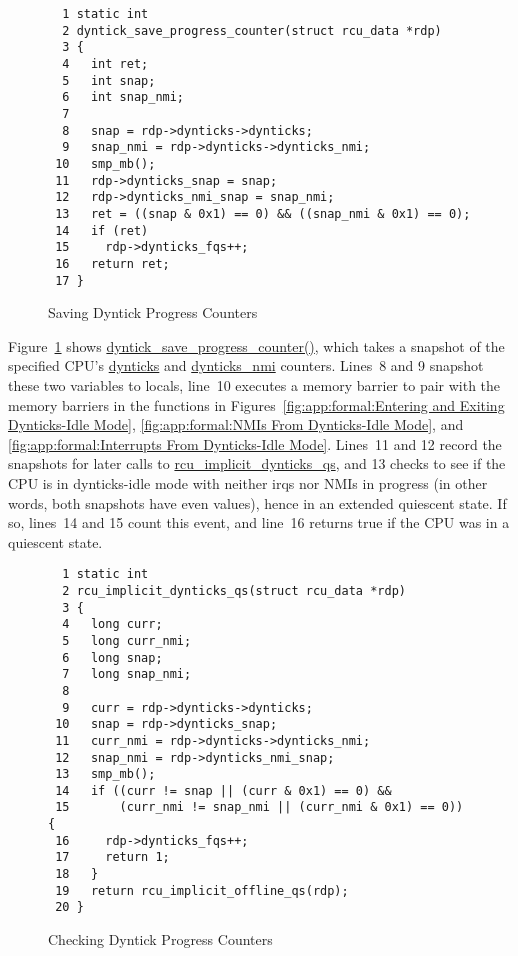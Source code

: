 \begin{figure}[tbp]
{ \scriptsize
\begin{verbatim}
  1 static int
  2 dyntick_save_progress_counter(struct rcu_data *rdp)
  3 {
  4   int ret;
  5   int snap;
  6   int snap_nmi;
  7 
  8   snap = rdp->dynticks->dynticks;
  9   snap_nmi = rdp->dynticks->dynticks_nmi;
 10   smp_mb();
 11   rdp->dynticks_snap = snap;
 12   rdp->dynticks_nmi_snap = snap_nmi;
 13   ret = ((snap & 0x1) == 0) && ((snap_nmi & 0x1) == 0);
 14   if (ret)
 15     rdp->dynticks_fqs++;
 16   return ret;
 17 }
\end{verbatim}
}
\caption{Saving Dyntick Progress Counters}
\label{fig:app:formal:Saving Dyntick Progress Counters}
\end{figure}

Figure~\ref{fig:app:formal:Saving Dyntick Progress Counters}
shows \url{dyntick_save_progress_counter()}, which takes a snapshot
of the specified CPU's \url{dynticks} and \url{dynticks_nmi}
counters.
Lines~8 and 9 snapshot these two variables to locals, line~10
executes a memory barrier to pair with the memory barriers in
the functions in
Figures~\ref{fig:app:formal:Entering and Exiting Dynticks-Idle Mode},
\ref{fig:app:formal:NMIs From Dynticks-Idle Mode}, and
\ref{fig:app:formal:Interrupts From Dynticks-Idle Mode}.
Lines~11 and 12 record the snapshots for later calls to
\url{rcu_implicit_dynticks_qs},
and 13 checks to see if the CPU is in dynticks-idle mode with
neither irqs nor NMIs in progress (in other words, both snapshots
have even values), hence in an extended quiescent state.
If so, lines~14 and 15 count this event, and line~16 returns
true if the CPU was in a quiescent state.

\begin{figure}[tbp]
{ \scriptsize
\begin{verbatim}
  1 static int
  2 rcu_implicit_dynticks_qs(struct rcu_data *rdp)
  3 {
  4   long curr;
  5   long curr_nmi;
  6   long snap;
  7   long snap_nmi;
  8 
  9   curr = rdp->dynticks->dynticks;
 10   snap = rdp->dynticks_snap;
 11   curr_nmi = rdp->dynticks->dynticks_nmi;
 12   snap_nmi = rdp->dynticks_nmi_snap;
 13   smp_mb();
 14   if ((curr != snap || (curr & 0x1) == 0) &&
 15       (curr_nmi != snap_nmi || (curr_nmi & 0x1) == 0)) {
 16     rdp->dynticks_fqs++;
 17     return 1;
 18   }
 19   return rcu_implicit_offline_qs(rdp);
 20 }
\end{verbatim}
}
\caption{Checking Dyntick Progress Counters}
\label{fig:app:formal:Checking Dyntick Progress Counters}
\end{figure}

